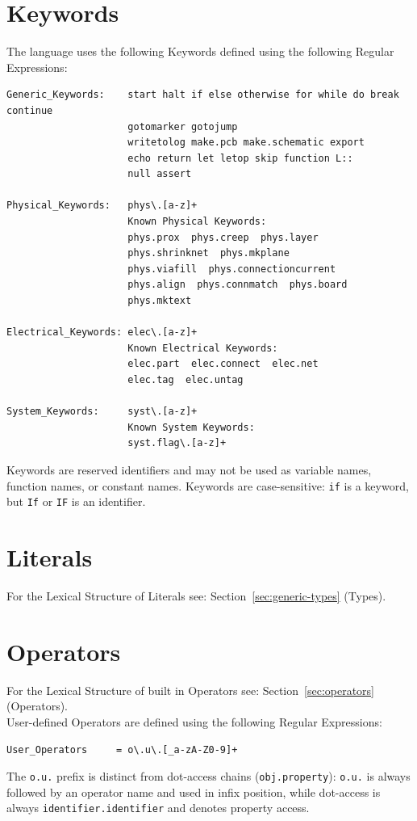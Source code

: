 \section{Keywords}
The language uses the following Keywords defined using the following Regular Expressions:
\begin{verbatim}
Generic_Keywords:    start halt if else otherwise for while do break continue
                     gotomarker gotojump 
                     writetolog make.pcb make.schematic export 
                     echo return let letop skip function L::
                     null assert

Physical_Keywords:   phys\.[a-z]+
                     Known Physical Keywords:
                     phys.prox  phys.creep  phys.layer
                     phys.shrinknet  phys.mkplane
                     phys.viafill  phys.connectioncurrent
                     phys.align  phys.connmatch  phys.board
                     phys.mktext

Electrical_Keywords: elec\.[a-z]+
                     Known Electrical Keywords:
                     elec.part  elec.connect  elec.net
                     elec.tag  elec.untag

System_Keywords:     syst\.[a-z]+
                     Known System Keywords:
                     syst.flag\.[a-z]+
\end{verbatim}
Keywords are reserved identifiers and may not be used as variable names, function names, or constant names. Keywords are case-sensitive: \texttt{if} is a keyword, but \texttt{If} or \texttt{IF} is an identifier.

\section{Literals}
For the Lexical Structure of Literals see:  Section~\ref{sec:generic-types} (Types).

\section{Operators}
For the Lexical Structure of built in Operators see:  Section~\ref{sec:operators} (Operators). \\
User-defined Operators are defined using the following Regular Expressions:
\begin{verbatim}
User_Operators     = o\.u\.[_a-zA-Z0-9]+
\end{verbatim}
The \texttt{o.u.} prefix is distinct from dot-access chains (\texttt{obj.property}): \texttt{o.u.} is always followed by an operator name and used in infix position, while dot-access is always \texttt{identifier.identifier} and denotes property access.

